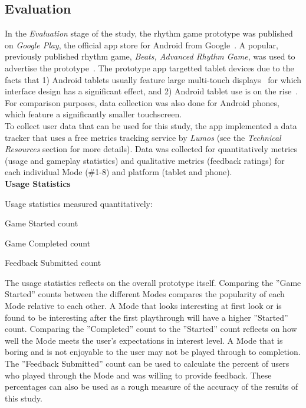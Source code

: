 \documentclass{sig-alternate}
\begin{document}
\subsection{Evaluation}
\label{subsec:project_outline}
In the \textit{Evaluation} stage of the study, the rhythm game prototype was published on \textit{Google Play}, the official app store for Android from Google~\cite{google_play}. A popular, previously published rhythm game, \textit{Beats, Advanced Rhythm Game}, was used to advertise the prototype~\cite{beats_portable}. The prototype app targetted tablet devices due to the facts that 1) Android tablets usually feature large multi-touch displays~\cite{honeycomb_tablet} for which interface design has a significant effect, and 2) Android tablet use is on the rise~\cite{tablet_use}. For comparison purposes, data collection was also done for Android phones, which feature a significantly smaller touchscreen.\\

To collect user data that can be used for this study, the app implemented a data tracker that uses a free metrics tracking service by \textit{Lumos} (see the \textit{Technical Resources} section for more details). Data was collected for quantitatively metrics (usage and gameplay statistics) and qualitative metrics (feedback ratings) for each individual Mode (\#1-8) and platform (tablet and phone).\\

\newpage
\noindent \textbf{Usage Statistics}

\vspace{+3pt}Usage statistics measured quantitatively:
\vspace{-3pt}\begin{itemize*}
	\item Game Started count\vspace{+3pt}
	\item Game Completed count\vspace{+3pt}
	\item Feedback Submitted count\vspace{+3pt}
\end{itemize*}

The usage statistics reflects on the overall prototype itself. Comparing the ''Game Started'' counts between the different Modes compares the popularity of each Mode relative to each other. A Mode that looks interesting at first look or is found to be interesting after the first playthrough will have a higher ''Started'' count. Comparing the ''Completed'' count to the ''Started'' count reflects on how well the Mode meets the user's expectations in interest level. A Mode that is boring and is not enjoyable to the user may not be played through to completion. The ''Feedback Submitted'' count can be used to calculate the percent of users who played through the Mode and was willing to provide feedback. These percentages can also be used as a rough measure of the accuracy of the results of this study.\\
\end{document}
